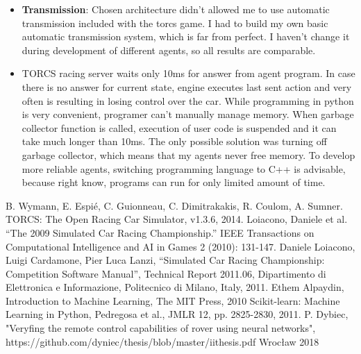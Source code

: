 \documentclass[declaration,shortabstract,english,inz]{iithesis}
\begin{document}
\begin{itemize}
    \item \textbf{Transmission}: Chosen architecture didn't allowed me to use automatic transmission included with the torcs game.
I had to build my own basic automatic transmission system, which is far from perfect.
I haven't change it during development of different agents, so all results are comparable.

    \item TORCS racing server waits only 10ms for answer from agent program.
In case there is no answer for current state, engine executes last sent action and very often is resulting in losing control over the car.
While programming in python is very convenient, programer can't manually manage memory.
When garbage collector function is called, execution of user code is suspended and it can take much longer than 10ms.
The only possible solution was turning off garbage collector, which means that my agents never free memory.
To develop more reliable agents, switching programming language to C++ is advisable, because right know, programs can run for only limited amount of time.
\end{itemize}



\begin{thebibliography}{1}
 B. Wymann, E. Espié, C. Guionneau, C. Dimitrakakis, R. Coulom, A. Sumner. TORCS: The Open Racing Car Simulator, v1.3.6, 2014.
 Loiacono, Daniele et al. “The 2009 Simulated Car Racing Championship.” IEEE Transactions on Computational Intelligence and AI in Games 2 (2010): 131-147.
 Daniele Loiacono, Luigi Cardamone, Pier Luca Lanzi, “Simulated Car
Racing Championship: Competition Software Manual”, Technical Report 2011.06, Dipartimento
di Elettronica e Informazione, Politecnico di Milano, Italy, 2011.
 Ethem Alpaydin, Introduction to Machine Learning, The MIT Press, 2010
 Scikit-learn: Machine Learning in Python, Pedregosa et al., JMLR 12, pp. 2825-2830, 2011.
 P. Dybiec, "Veryfing the remote control capabilities of rover using neural networks", https://github.com/dyniec/thesis/blob/master/iithesis.pdf Wrocław 2018

\end{thebibliography}
\end{document}
